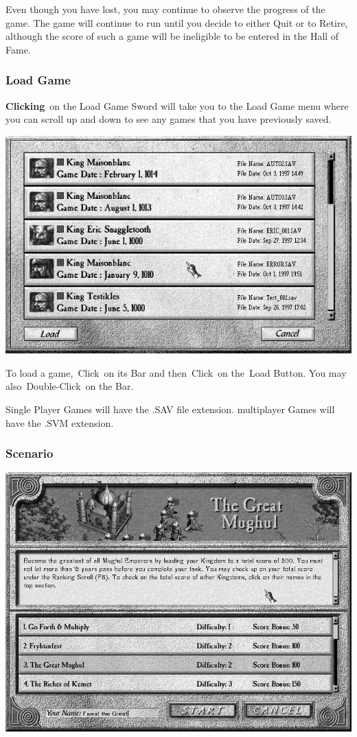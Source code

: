 Even though you have lost, you may continue to observe the progress of the game. The game will continue to run until you decide to either Quit or to Retire, although the score of such a game will be ineligible to be entered in the Hall of Fame.

\subsubsection{Load Game}

\textbf{Clicking} on the Load Game Sword will take you to the Load Game menu where you can scroll up and down to see any games that you have previously saved.

\begin{center}
	\includegraphics[width=0.7\linewidth]{Iload}
\end{center}

To load a game, Click on its Bar and then Click on the Load Button.
You may also Double-Click on the Bar.

Single Player Games will have the .SAV file extension. multiplayer Games will have the .SVM extension.

\subsubsection{Scenario}

\begin{center}
	\includegraphics[width=0.7\linewidth]{Iscenario}
\end{center}

